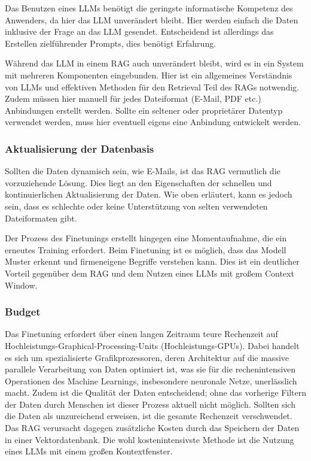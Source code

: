 Das Benutzen eines LLMs benötigt die geringste informatische Kompetenz des Anwenders, da hier das LLM unverändert bleibt.
Hier werden einfach die Daten inklusive der Frage an das LLM gesendet.
Entscheidend ist allerdings das Erstellen zielführender Prompts, dies benötigt Erfahrung.

Während das LLM in einem RAG auch unverändert bleibt, wird es in ein System mit mehreren Komponenten eingebunden.
Hier ist ein allgemeines Verständnis von LLMs und effektiven Methoden für den Retrieval Teil des RAGs notwendig.
Zudem müssen hier manuell für jedes Dateiformat (E-Mail, PDF etc.) Anbindungen erstellt werden. Sollte ein seltener oder proprietärer Datentyp verwendet werden, muss hier eventuell eigens eine Anbindung entwickelt werden.
\subsubsection{Aktualisierung der Datenbasis}
Sollten die Daten dynamisch sein, wie E-Mails, ist das RAG vermutlich die vorzuziehende Lösung. Dies liegt an den Eigenschaften der schnellen und kontinuierlichen Aktualisierung der Daten.
Wie oben erläutert, kann es jedoch sein, dass es schlechte oder keine Unterstützung von selten verwendeten Dateiformaten gibt.

Der Prozess des Finetunings erstellt hingegen eine Momentaufnahme, die ein erneutes Training erfordert.
Beim Finetuning ist es möglich, dass das Modell Muster erkennt und firmeneigene Begriffe verstehen kann. Dies ist ein deutlicher Vorteil gegenüber dem RAG und dem Nutzen eines LLMs mit großem Context Window.


\subsubsection{Budget}
Das Finetuning erfordert über einen langen Zeitraum teure Rechenzeit auf Hochleistungs-Graphical-Processing-Units (Hochleistungs-GPUs).
Dabei handelt es sich um spezialisierte Grafikprozessoren, deren Architektur auf die massive parallele Verarbeitung von Daten optimiert ist, was sie für die rechenintensiven Operationen des Machine Learnings, insbesondere neuronale Netze, unerlässlich macht.
Zudem ist die Qualität der Daten entscheidend; ohne das vorherige Filtern der Daten durch Menschen ist dieser Prozess aktuell nicht möglich. Sollten sich die Daten als unzureichend erweisen, ist die gesamte Rechenzeit verschwendet.
Das RAG verursacht dagegen zusätzliche Kosten durch das Speichern der Daten in einer Vektordatenbank.
Die wohl kostenintensivste Methode ist die Nutzung eines LLMs mit einem großen Kontextfenster.


